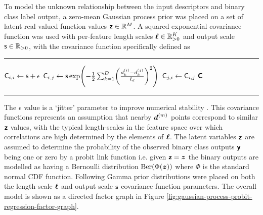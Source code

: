 To model the unknown relationship between the input descriptors and binary class label output, a zero-mean Gaussian process prior \citep{rasmussen2006gaussian} was placed on a set of latent real-valued function values $\boldsymbol{\mathsf{z}} \in \mathbb{R}^M$. A squared exponential covariance function was used with per-feature length scales $\boldsymbol{\mathsf{\ell}} \in \mathbb{R}_{>0}^K$ and output scale $\mathsf{s} \in \mathbb{R}_{>0}$, with the covariance function specifically defined as
{
\vspace{2mm}
\hrule
\small
\vspace{1mm}
\begin{algorithmic}
      \State $\mathsf{C}_{i,i} \gets \mathsf{s} + \epsilon$
        \State $\rvar{C}_{i,j} \gets \rvar{s} \exp\lpa -\frac{1}{2} \sum_{k=1}^D \lpa \frac{d_k^{(i)} - d_k^{(j)}}{\rvar{\ell}_d} \rpa^2 \rpa$
        \State $\mathsf{C}_{j,i} \gets \mathsf{C}_{i,j}$
      \EndFor
    \EndFor
    \State\Return $\boldsymbol{\mathsf{C}}$
  \EndFunction
\end{algorithmic}
\vspace{2mm}
\hrule
\vspace{1mm}
}
The $\epsilon$ value is a `jitter' parameter to improve numerical stability \citep{rasmussen2006gaussian}. This covariance functions represents an assumption that nearby $\boldsymbol{d}^{(m)}$ points correspond to similar $\boldsymbol{\mathsf{z}}$ values, with the typical length-scales in the feature space over which correlations are high determined by the elements of $\boldsymbol{\mathsf{\ell}}$. The latent variables $\boldsymbol{\mathsf{z}}$ are assumed to determine the probability of the observed binary class outputs $\boldsymbol{\mathsf{y}}$ being one or zero by a probit link function i.e. given $\boldsymbol{\mathsf{z}}=\boldsymbol{z}$ the binary outputs are modelled as having a Bernoulli distribution $\textrm{Ber}(\Phi(\boldsymbol{z}))$ where $\Phi$ is the standard normal \ac{CDF} function. Following \citep{filippone2014pseudo} Gamma prior distributions were placed on both the length-scale $\boldsymbol{\mathsf{\ell}}$ and output scale $\mathsf{s}$ covariance function parameters. The overall model is shown as a directed factor graph in Figure \ref{fig:gaussian-process-probit-regression-factor-graph}.

